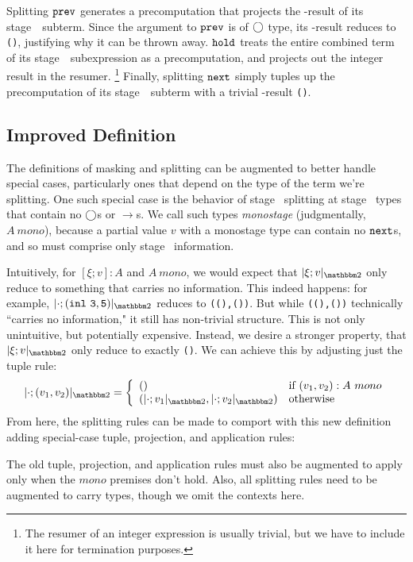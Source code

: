 \begin{concretesyntax}
Splitting ${\tt prev}$ generates a precomputation that projects the \bbone-result of its stage~\bbone\ subterm.
Since the argument to ${\tt prev}$ is of $\bigcirc$ type, its \bbone-result reduces to \texttt{()}, justifying why it can be thrown away.
${\tt hold}$ treats the entire combined term of its stage~\bbone\ subexpression as a precomputation, 
and projects out the integer result in the resumer. 
\footnote{The resumer of an integer expression is usually trivial, 
but we have to include it here for termination purposes.} 
Finally, splitting ${\tt next}$ simply tuples up the precomputation of its stage~\bbtwo\ subterm with a trivial \bbone-result \texttt{()}.


\subsection{Improved Definition}
\label{sec:resumers}

The definitions of masking and splitting can be augmented to better handle special cases,
particularly ones that depend on the type of the term we're splitting.
One such special case is the behavior of stage \bbone\ splitting at stage \bbone\ types that contain no $\bigcirc$s or $\to$s.
We call such types {\em monostage} (judgmentally, $A~mono$), 
because a partial value $v$ with a monostage type can contain no ${\tt next}$s,
and so must comprise only stage \bbone\ information.

Intuitively, for $[\xi;v] : A$ and $A~mono$, 
we would expect that $\maskt{\xi;v}$ only reduce to something that carries no information.
This indeed happens: for example, $\maskt {\cdot;\mathtt{(inl~3,5)}}$ reduces to \texttt{((),())}.
But while \texttt{((),())} technically ``carries no information," it still has non-trivial structure.
This is not only unintuitive, but potentially expensive.
Instead, we desire a stronger property, that $\maskt{\xi;v}$ only reduce to exactly \texttt{()}. 
We can achieve this by adjusting just the tuple rule:
\[
\maskt{\cdot;(v_1,v_2)} = \left\{ \begin{array}{ll} 
\mathtt{()} &\text{if } (v_1,v_2):A~mono\\ 
(\maskt{\cdot;v_1},\maskt{\cdot;v_2}) &\text{otherwise} \end{array} \right.
\]
From here, the splitting rules can be made to comport with this new 
definition adding special-case tuple, projection, and application 
rules:
The old tuple, projection, and application rules 
must also be augmented to apply only when the $mono$ premises don't hold.
Also, all splitting rules need to be augmented to carry types, though
we omit the contexts here.


\end{concretesyntax}


